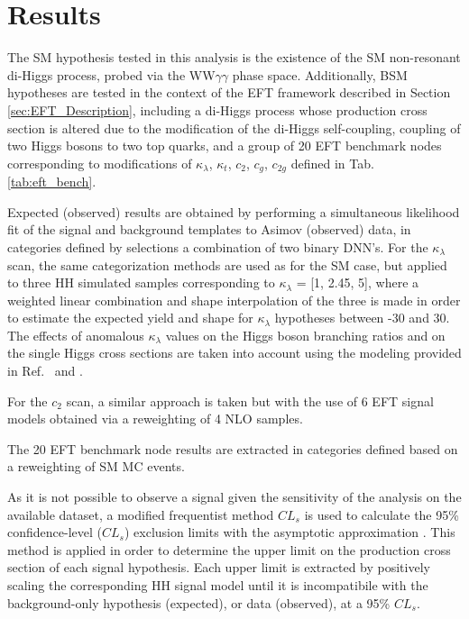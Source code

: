 \section{Results} \label{sec:results}

The SM hypothesis tested in this analysis is the existence of the SM non-resonant di-Higgs process, probed via the WW$\gamma\gamma$ phase space. Additionally, BSM hypotheses are tested in the context of the 
EFT framework described in Section \ref{sec:EFT_Description}, including a di-Higgs process whose production cross section is altered due to the modification 
of the di-Higgs self-coupling, coupling of two Higgs bosons to two top quarks, and a group of 20 EFT benchmark nodes corresponding to modifications 
of $\kappa_{\lambda}$, $\kappa_{t}$, $c_{2}$, $c_{g}$, $c_{2g}$ defined in Tab. \ref{tab:eft_bench}. 

Expected (observed) results are obtained by performing a simultaneous likelihood fit of the signal and 
background templates to Asimov (observed) data, in categories defined by selections a combination 
of two binary DNN's. For the $\kappa_{\lambda}$ scan, the same categorization methods are used as for the 
SM case, but applied to three HH simulated samples corresponding to $\kappa_{\lambda}$ = [1, 2.45, 5], where a weighted linear combination and shape interpolation of the three is made in order to estimate 
the expected yield and shape for $\kappa_{\lambda}$ hypotheses between -30 and 30. The effects of anomalous $\kappa_{\lambda}$ values on the Higgs boson branching ratios and on the single Higgs cross sections are taken into account using the modeling provided in Ref.~\cite{Degrassi:2016wml} and \cite{Maltoni:2017ims}.

For the $c_{2}$ scan, a similar approach is taken but with the use of 6 EFT signal models obtained via a reweighting of 4 NLO samples. 

The 20 EFT benchmark node results are extracted in categories defined based on a reweighting of SM MC events.  

As it is not possible to observe a signal given the sensitivity of the analysis on the available dataset, a modified frequentist method $CL_s$ \cite{CLS1, CLS2} is used to 
calculate the 95\% confidence-level ($CL_{s}$) exclusion limits with the asymptotic approximation \cite{Cowan:2010js}. This method is applied in order to determine the upper limit 
on the production cross section of each signal hypothesis. Each upper limit is extracted by positively scaling the corresponding 
HH signal model until it is incompatibile with the background-only hypothesis (expected), or data (observed), at a 95\% $CL_{s}$.   

